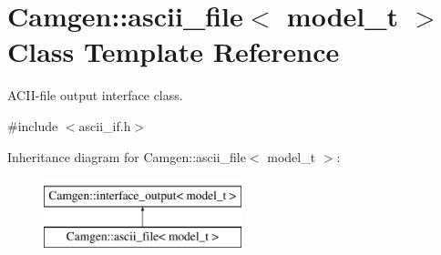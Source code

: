 \hypertarget{a00017}{}\section{Camgen\+:\+:ascii\+\_\+file$<$ model\+\_\+t $>$ Class Template Reference}
\label{a00017}


A\+C\+I\+I-\/file output interface class.  




{\ttfamily \#include $<$ascii\+\_\+if.\+h$>$}

Inheritance diagram for Camgen\+:\+:ascii\+\_\+file$<$ model\+\_\+t $>$\+:\begin{figure}[H]
\begin{center}
\leavevmode
\includegraphics[height=2.000000cm]{a00017}
\end{center}
\end{figure}
